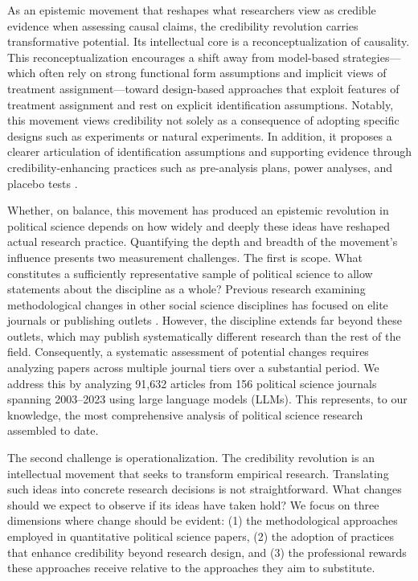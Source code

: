 \documentclass[12pt]{article}
\begin{document}
As an epistemic movement that reshapes what researchers view as credible evidence when assessing causal claims, the credibility revolution carries transformative potential. Its intellectual core is a reconceptualization of causality. This reconceptualization encourages a shift away from model-based strategies---which often rely on strong functional form assumptions and implicit views of treatment assignment---toward design-based approaches that exploit features of treatment assignment and rest on explicit identification assumptions. Notably, this movement views credibility not solely as a consequence of adopting specific designs such as experiments or natural experiments. In addition, it proposes a clearer articulation of identification assumptions and supporting evidence through credibility-enhancing practices such as pre-analysis plans, power analyses, and placebo tests \citep{sekhon2009opiate}. %

Whether, on balance, this movement has produced an epistemic revolution in political science depends on how widely and deeply these ideas have reshaped actual research practice. Quantifying the depth and breadth of the movement's influence presents two measurement challenges. The first is scope. What constitutes a sufficiently representative sample of political science to allow statements about the discipline as a whole? Previous research examining methodological changes in other social science disciplines has focused on elite journals or publishing outlets \citep[e.g., ][]{currie2020technology, goldsmith2024tracking}. However, the discipline extends far beyond these outlets, which may publish systematically different research than the rest of the field. Consequently, a systematic assessment of potential changes requires analyzing papers across multiple journal tiers over a substantial period. We address this by analyzing 91,632 articles from 156 political science journals spanning 2003--2023 using large language models (LLMs). This represents, to our knowledge, the most comprehensive analysis of political science research assembled to date.

The second challenge is operationalization. The credibility revolution is an intellectual movement that seeks to transform empirical research. Translating such ideas into concrete research decisions is not straightforward. What changes should we expect to observe if its ideas have taken hold? We focus on three dimensions where change should be evident: (1) the methodological approaches employed in quantitative political science papers, (2) the adoption of practices that enhance credibility beyond research design, and (3) the professional rewards these approaches receive relative to the approaches they aim to substitute.
\end{document}
